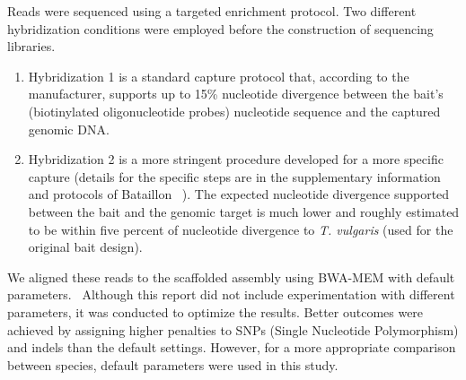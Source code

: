 Reads were sequenced using a targeted enrichment protocol. Two different hybridization conditions were employed before the construction of sequencing libraries.\\
\begin{enumerate}
    \item Hybridization 1 is a standard capture protocol that, according to the manufacturer, supports up to 15\% nucleotide divergence between the bait's (biotinylated oligonucleotide probes) nucleotide sequence and the captured genomic DNA. 
    \item Hybridization 2 is a more stringent procedure developed for a more specific capture (details for the specific steps are in the supplementary information and protocols of Bataillon \etal~\cite{bataillonGenotypePhenotypeGenetic2022}). The expected nucleotide divergence supported between the bait and the genomic target is much lower and roughly estimated to be within five percent of nucleotide divergence to \textit{T. vulgaris} (used for the original bait design).
\end{enumerate} 

We aligned these reads to the scaffolded assembly using BWA-MEM with default parameters.~\cite{liAligningSequenceReads2013} Although this report did not include experimentation with different parameters, it was conducted to optimize the results. Better outcomes were achieved by assigning higher penalties to SNPs (Single Nucleotide Polymorphism) and indels than the default settings. However, for a more appropriate comparison between species, default parameters were used in this study.\\
